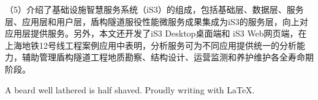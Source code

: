 \begin{cabstract}
（5）介绍了基础设施智慧服务系统（iS3）的组成，包括基础层、数据层、服务层、应用层和用户层，盾构隧道服役性能微服务成果集成为iS3的服务层，向上对应用层提供服务。另外，本文还开发了iS3 Desktop桌面端和 iS3 Web网页端，在上海地铁12号线工程案例应用中表明，分析服务可为不同应用提供统一的分析能力，辅助管理盾构隧道工程地质勘察、结构设计、运营监测和养护维护各全寿命期阶段。

\end{cabstract}



\begin{eabstract}

A beard well lathered is half shaved. Proudly writing with \LaTeX{}.

\end{eabstract}

